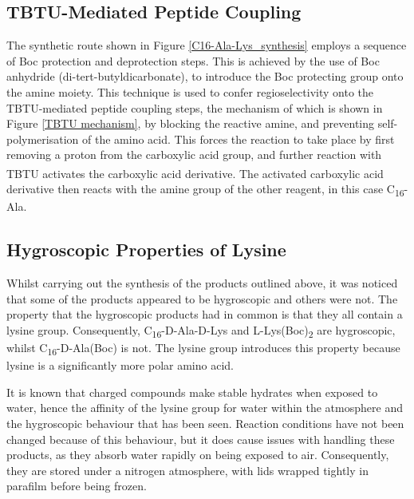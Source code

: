 \subsection{TBTU-Mediated Peptide Coupling}
The synthetic route shown in Figure \ref{C16-Ala-Lys_synthesis} employs a sequence of Boc protection and deprotection steps. This is achieved by the use of Boc anhydride (di-tert-butyldicarbonate), to introduce the Boc protecting group onto the amine moiety. This technique is used to confer regioselectivity onto the TBTU-mediated peptide coupling steps, the mechanism of which is shown in Figure \ref{TBTU mechanism}, by blocking the reactive amine, and preventing self-polymerisation of the amino acid. This forces the reaction to take place by first removing a proton from the carboxylic acid group, and further reaction with TBTU activates the carboxylic acid derivative.\textsuperscript{\cite{Valeur2009AmideReagents}} The activated carboxylic acid derivative then reacts with the amine group of the other reagent, in this case C\textsubscript{16}-Ala. 

\subsection{Hygroscopic Properties of Lysine}
Whilst carrying out the synthesis of the products outlined above, it was noticed that some of the products appeared to be hygroscopic and others were not. 
The property that the hygroscopic products had in common is that they all contain a lysine group. Consequently, C\textsubscript{16}-D-Ala-D-Lys and L-Lys(Boc)\textsubscript{2} are hygroscopic, whilst C\textsubscript{16}-D-Ala(Boc) is not. 
The lysine group introduces this property because lysine is a significantly more polar amino acid. 

It is known that charged compounds make stable hydrates when exposed to water, hence the affinity of the lysine group for water within the atmosphere and the hygroscopic behaviour that has been seen. Reaction conditions have not been changed because of this behaviour, but it does cause issues with handling these products, as they absorb water rapidly on being exposed to air. Consequently, they are stored under a nitrogen atmosphere, with lids wrapped tightly in parafilm before being frozen. 
\newpage

